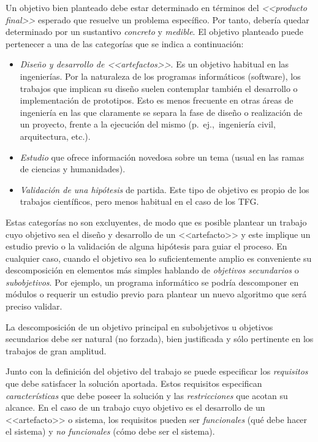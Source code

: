 Un objetivo bien planteado debe estar determinado en términos del \emph{<<producto final>>} esperado que resuelve un problema específico. Por tanto, debería quedar determinado por un sustantivo \emph{concreto} y \emph{medible}. El objetivo planteado puede pertenecer a una de las categorías que se indica a continuación:
\begin{itemize}
	\item \emph{Diseño y desarrollo de <<artefactos>>}. Es un objetivo habitual en las ingenierías. Por la naturaleza de los programas informáticos (software), los trabajos que implican su diseño suelen contemplar también el desarrollo o implementación de prototipos. Esto es menos frecuente en otras áreas de ingeniería en las que claramente se separa la fase de diseño o realización de un proyecto, frente a la ejecución del mismo (p.~ej.,~ingeniería civil, arquitectura, etc.). 
    
	\item \emph{Estudio} que ofrece información novedosa sobre un tema (usual en las ramas de ciencias y humanidades). 
    
	\item \emph{Validación de una hipótesis} de partida. Este tipo de objetivo es propio de los trabajos científicos, pero menos habitual en el caso de los TFG.
\end{itemize}

Estas categorías no son excluyentes, de modo que es posible plantear un trabajo cuyo objetivo sea el diseño y desarrollo de un <<artefacto>> y este implique un estudio previo o la validación de alguna hipótesis para guiar el proceso. En cualquier caso, cuando el objetivo sea lo suficientemente amplio es conveniente su descomposición en elementos más simples hablando de \emph{objetivos secundarios} o \emph{subobjetivos}. Por ejemplo, un programa informático se podría descomponer en módulos o requerir un estudio previo para plantear un nuevo algoritmo que será preciso validar. 

La descomposición de un objetivo principal en subobjetivos u objetivos secundarios debe ser natural (no forzada), bien justificada y sólo pertinente en los trabajos de gran amplitud.

Junto con la definición del objetivo del trabajo se puede especificar los \emph{requisitos} que debe satisfacer la solución aportada. Estos requisitos especifican \emph{características} que debe poseer la solución y las \emph{restricciones} que acotan su alcance. En el caso de un trabajo cuyo objetivo es el desarrollo de un <<artefacto>> o sistema, los requisitos pueden ser \emph{funcionales} (qué debe hacer el sistema) y \emph{no funcionales} (cómo debe ser el sistema). 

